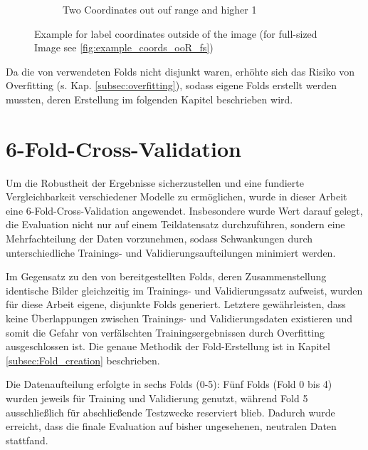 \begin{figure}[h]
\begin{subfigure}[b]{0.45\textwidth}
        \caption{Two Coordinates out ouf range and higher 1}
        \label{fig:higher1}
    \end{subfigure}
    \caption[Example for label coordinates outside of the image]{Example for label coordinates outside of the image (for full-sized Image see \ref{fig:example_coords_ooR_fs})}
    \label{fig:example_coords_ooR}
\end{figure}

Da die von \citeauthor{Razakarivony2015} \cite{Razakarivony2015} verwendeten Folds nicht disjunkt waren, erhöhte sich das Risiko von Overfitting (s. Kap. \ref{subsec:overfitting}), sodass eigene Folds erstellt werden mussten, deren Erstellung im folgenden Kapitel beschrieben wird. 






\section{6-Fold-Cross-Validation}
\label{sec_5Fold_CV}

Um die Robustheit der Ergebnisse sicherzustellen und eine fundierte Vergleichbarkeit verschiedener Modelle zu ermöglichen, wurde in dieser Arbeit eine 6-Fold-Cross-Validation angewendet. Insbesondere wurde Wert darauf gelegt, die Evaluation nicht nur auf einem Teildatensatz durchzuführen, sondern eine Mehrfachteilung der Daten vorzunehmen, sodass Schwankungen durch unterschiedliche Trainings- und Validierungsaufteilungen minimiert werden.

Im Gegensatz zu den von \citeauthor{Razakarivony2015} \cite{Razakarivony2015} bereitgestellten Folds, deren Zusammenstellung identische Bilder gleichzeitig im Trainings- und Validierungssatz aufweist, wurden für diese Arbeit eigene, disjunkte Folds generiert. Letztere gewährleisten, dass keine Überlappungen zwischen Trainings- und Validierungsdaten existieren und somit die Gefahr von verfälschten Trainingsergebnissen durch Overfitting ausgeschlossen ist. Die genaue Methodik der Fold-Erstellung ist in Kapitel \ref{subsec:Fold_creation} beschrieben. 

Die Datenaufteilung erfolgte in sechs Folds (0-5): Fünf Folds (Fold 0 bis 4) wurden jeweils für Training und Validierung genutzt, während Fold 5 ausschließlich für abschließende Testzwecke reserviert blieb. Dadurch wurde erreicht, dass die finale Evaluation auf bisher ungesehenen, neutralen Daten stattfand.


